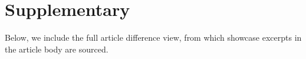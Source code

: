 \section{Supplementary}



Below, we include the full article difference view, from which showcase excerpts in the article body are sourced.



